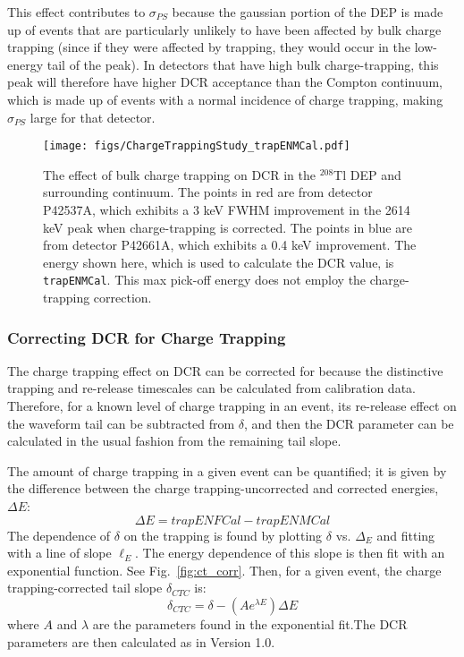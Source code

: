 \documentclass[groupedaddress,rmp,amsmath,amssymb,bibnotes,altaffilletter,twocolumn]{revtex4-1}
\begin{document}
This effect contributes to $\sigma_{PS}$ because the gaussian portion of the DEP is made up of events that are particularly unlikely to have been affected by bulk charge trapping (since if they were affected by trapping, they would occur in the low-energy tail of the peak). In detectors that have high bulk charge-trapping, this peak will therefore have higher DCR acceptance than the Compton continuum, which is made up of events with a normal incidence of charge trapping, making $\sigma_{PS}$ large for that detector. 

\begin{figure}[h]
 \centering
 \texttt{[image: figs/ChargeTrappingStudy\_trapENMCal.pdf]}
 \caption{The effect of bulk charge trapping on DCR in the $^{208}$Tl DEP and surrounding continuum. The points in red are from detector P42537A, which exhibits a 3 keV FWHM improvement in the 2614 keV peak when charge-trapping is corrected. The points in blue are from detector P42661A, which exhibits a 0.4 keV improvement. The energy shown here, which is used to calculate the DCR value, is {\tt trapENMCal}. This max pick-off energy does not employ the charge-trapping correction.} 
 \label{fig:ct_DCRvE}
\end{figure}

\subsubsection{Correcting DCR for Charge Trapping}
The charge trapping effect on DCR can be corrected for because the distinctive trapping and re-release timescales can be calculated from calibration data. Therefore, for a known level of charge trapping in an event, its re-release effect on the waveform tail can be subtracted from $\delta$, and then the DCR parameter can be calculated in the usual fashion from the remaining tail slope. 

The amount of charge trapping in a given event can be quantified; it is given by the difference between the charge trapping-uncorrected and corrected energies, $\Delta E$:
$$\Delta E =  trapENFCal-trapENMCal $$
The dependence of $\delta$ on the trapping is found by plotting $\delta$ vs. $\Delta_{E}$ and fitting with a line of slope $\ell_{E}$. The energy dependence of this slope is then fit with an exponential function. See Fig.~\ref{fig:ct_corr}. Then, for a given event, the charge trapping-corrected tail slope $\delta_{CTC}$ is:
$$\delta_{CTC} = \delta - (Ae^{\lambda E})\Delta E$$
where $A$ and $\lambda$ are the parameters found in the exponential fit.The DCR parameters are then calculated as in Version 1.0.
\end{document}
